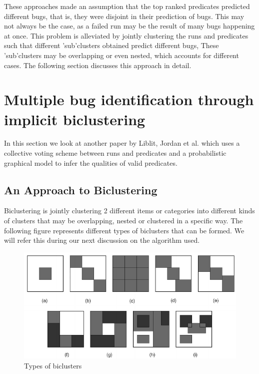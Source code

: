 \documentclass[a4paper,10pt, margin=0.75in]{article}
\begin{document}
These approaches made an assumption that the top ranked predicates predicted different bugs, that is, they were disjoint in their prediction of bugs. This may not always be the case, as a failed run may be the result of many bugs happening at once. This problem is alleviated by jointly clustering the runs and predicates such that different 'sub'clusters obtained predict different bugs, These 'sub'clusters may be overlapping or even nested, which accounts for different cases. The following section discusses this approach in detail.

\section{Multiple bug identification through implicit biclustering}
In this section we look at another paper by Liblit, Jordan et al.\cite{DBLP:conf/icml/ZhengJLNA06} which uses a collective voting scheme between runs and predicates and a probabilistic graphical model to infer the qualities of valid predicates.
\subsection{An Approach to Biclustering}
Biclustering is jointly clustering 2 different items or categories into different kinds of clusters that may be overlapping, nested or clustered in a specific way. The following figure represents different types of biclusters that can be formed. We will refer this during our next discussion on the algorithm used.
\begin{figure}[h]
    \centering
    \includegraphics[width=\linewidth]{bivluster.png}
    \caption{Types of biclusters}
\end{figure}
\end{document}
